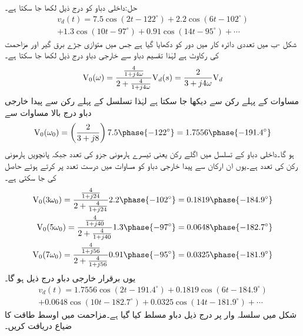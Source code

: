 حل:داخلی دباو کو درج ذیل لکھا جا سکتا ہے۔
 \begin{multline}\label{مساوات_فوریئر_لاگو_دباو_الف}
v_d(t)=7.5\cos(2t-122^{\circ})+2.2\cos(6t-102^{\circ})\\
+1.3\cos(10t-97^{\circ})+0.91\cos(14t-95^{\circ})+\cdots
\end{multline}
شکل -ب میں تعددی دائرہ کار میں دور کو دکھایا گیا ہے جس میں متوازی جڑے برق گیر اور مزاحمت کی
 رکاوٹ  ہے  لہٰذا تقسیم دباو سے خارجی دباو درج ذیل لکھا جا سکتا ہے۔
\begin{align}\label{مساوات_فوریئر_لاگو_دباو_ب}
{\ensuremath{{\textup{V}}}}_0(\omega)=\frac{\frac{4}{1+j4\omega}}{2+\frac{4}{1+j4\omega}} {{\textup{V}}}_d(s)=\frac{2}{3+j4\omega} {{\textup{V}}}_d
\end{align}
مساوات  کے پہلے رکن سے   دیکھا جا سکتا ہے لہٰذا تسلسل کے پہلے رکن سے پیدا خارجی دباو درج بالا مساوات سے
\begin{align*}
\bV_0(\omega_0)=\left(\frac{2}{3+j8}\right) 7.5\phase{-122^{\circ}} =1.7556\phase{-191.4^{\circ}}
\end{align*}
ہو گا۔داخلی دباو کے تسلسل میں اگلے رکن یعنی تیسرے ہارمونی جزو کی تعدد  جبکہ  پانچویں ہارمونی رکن کی تعدد  ہے۔یوں ان ارکان سے پیدا خارجی دباو کو مساوات  میں درست تعدد پر کرتے ہوئے حاصل کی جا سکتی ہے۔
\begin{align*}
\bV_0(3\omega_0)=\frac{\frac{4}{1+j24}}{2+\frac{4}{1+j24}} 2.2\phase{-102^{\circ}}=0.1819\phase{-184.9^{\circ}}\\
\bV_0(5\omega_0)=\frac{\frac{4}{1+j40}}{2+\frac{4}{1+j40}} 1.3\phase{-97^{\circ}}=0.0648\phase{-182.7^{\circ}}\\
\bV_0(7\omega_0)=\frac{\frac{4}{1+j56}}{2+\frac{4}{1+j56}} 0.91\phase{-95^{\circ}}=0.0325\phase{-181.9^{\circ}}
\end{align*}
یوں برقرار خارجی دباو درج ذیل ہو گا۔
 \begin{multline}
v_d(t)=1.7556\cos(2t-191.4^{\circ})+0.1819\cos(6t-184.9^{\circ})\\
+0.0648\cos(10t-182.7^{\circ})+0.0325\cos(14t-181.9^{\circ})+\cdots
\end{multline}
شکل  میں سلسلہ وار  پر درج ذیل دباو  مسلط کیا گیا ہے۔مزاحمت میں اوسط طاقت کا ضیاع دریافت کریں۔

